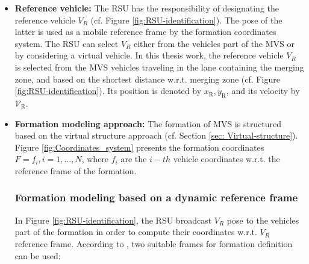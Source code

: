 \begin{itemize}
    \item \textbf{Reference vehicle:} The RSU has the responsibility of designating the reference vehicle $V_R$ (cf. Figure \ref{fig:RSU-identification}). The pose of the latter is used as a mobile reference frame by the formation coordinates system. The RSU can select $V_R$ either from the vehicles part of the MVS or by considering a virtual vehicle. In this thesis work, the reference vehicle $V_R$ is selected from the MVS vehicles traveling in the lane containing the merging zone, and based on the shortest distance w.r.t. merging zone (cf. Figure \ref{fig:RSU-identification}). Its position is denoted by $x_{\text{R}}, y_{\text{R}}$, and its velocity by $\mathcal{V}_{\text{R}}$.
    
    
 

    \item \textbf{Formation modeling approach:} The formation of MVS is structured based on the virtual structure approach (cf. Section \ref{sec: Virtual-structure}). Figure \ref{fig:Coordinates_system} presents the formation coordinates  $F={f_i,i=1,\ldots,N}$, where $f_i$ are the $i-th$ vehicle coordinates w.r.t. the reference frame of the formation. 

    





\subsubsection{Formation modeling based on a dynamic reference frame}


In Figure \ref{fig:RSU-identification}, the RSU broadcast $V_{R}$ pose to the vehicles part of the formation in order to compute their coordinates w.r.t. $V_R$ reference frame. According to \cite{8430659}, two suitable frames for formation definition can be used: 



\end{itemize}
